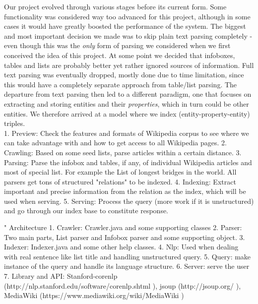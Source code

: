\documentclass[12pt,twocolumn]{article}
\begin{document}
Our project evolved through various stages before its current form. Some functionality was considered way too advanced for this project, although in some cases it would have greatly boosted the performance of the system. The biggest and most important decision we made was to skip plain text parsing completely - even though this was the \emph{only} form of parsing we considered when we first conceived the idea of this project. At some point we decided that infoboxes, tables and lists are probably better yet rather ignored sources of information. Full text parsing was eventually dropped, mostly done due to time limitation, since this would have a completely separate approach from table/list parsing. The departure from text parsing then led to a different paradigm, one that focuses on extracting and storing entities and their \emph{properties}, which in turn could be other entities. We therefore arrived at a model where we index (entity-property-entity) triples.  \\

1.	Preview: Check the features and formats of Wikipedia corpus to see where we can take advantage with and how to get access to all Wikipedia pages.
2.	Crawling: Based on some seed lists, parse articles within a certain distance.
3.	Parsing: Parse the infobox and tables, if any, of individual Wikipedia articles and most of special list. For example the List of longest bridges in the world. All parsers get tons of structured "relations" to be indexed.
4.	Indexing: Extract important and precise information from the relation as the index, which will be used when serving.
5.	Serving: Process the query (more work if it is unstructured) and go through our index base to constitute response. 



"	Architecture
1.	Crawler: Crawler.java and some supporting classes
2.	Parser: Two main parts, List parser and Infobox parser and some supporting object.
3.	Indexer: Indexer.java and some other help classes.
4.	Nlp: Used when dealing with real sentence like list title and handling unstructured query. 
5.	Query: make instance of the query and handle its language structure.
6.	Server: serve the user
7.	Library and API: Stanford-corenlp (http://nlp.stanford.edu/software/corenlp.shtml ), jsoup (http://jsoup.org/ ),  MediaWiki (https://www.mediawiki.org/wiki/MediaWiki )
\end{document}
